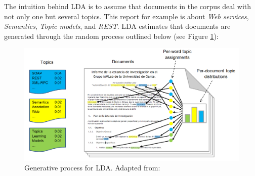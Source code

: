 The intuition behind LDA is to assume that documents in the corpus deal with not only one but several topics. This report for example is about \emph{Web services}, \emph{Semantics}, \emph{Topic models}, and \emph{REST}. LDA estimates that documents are generated through the random process outlined below (see Figure \ref{lda-gen-process}): 

\begin{figure}
\includegraphics[scale=0.40]{images/lda-gen-model-eng}

\caption{Generative process for LDA. {\scriptsize Adapted from: \cite{Blei:2012}}}
\label{lda-gen-process}
\end{figure}

